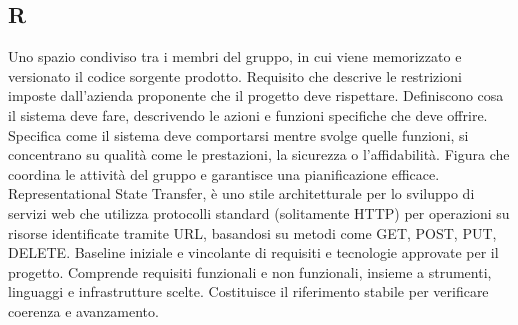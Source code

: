 \begin{center}
\section*{R}
\end{center}
Uno spazio condiviso tra i membri del gruppo, in cui viene memorizzato e versionato il codice sorgente prodotto.
Requisito che descrive le restrizioni imposte dall'azienda proponente che il progetto deve rispettare.
Definiscono cosa il sistema deve fare, descrivendo le azioni e funzioni specifiche che deve offrire.
Specifica come il sistema deve comportarsi mentre svolge quelle funzioni, si concentrano su qualità come le prestazioni, la sicurezza o l'affidabilità.
Figura che coordina le attività del gruppo e garantisce una pianificazione efficace.
Representational State Transfer, è uno stile architetturale per lo sviluppo di servizi web che utilizza protocolli standard (solitamente HTTP) per operazioni su risorse identificate tramite URL, basandosi su metodi come GET, POST, PUT, DELETE.
Baseline iniziale e vincolante di requisiti e tecnologie approvate per il progetto. Comprende requisiti funzionali e non funzionali, insieme a strumenti, linguaggi e infrastrutture scelte. Costituisce il riferimento stabile per verificare coerenza e avanzamento.
